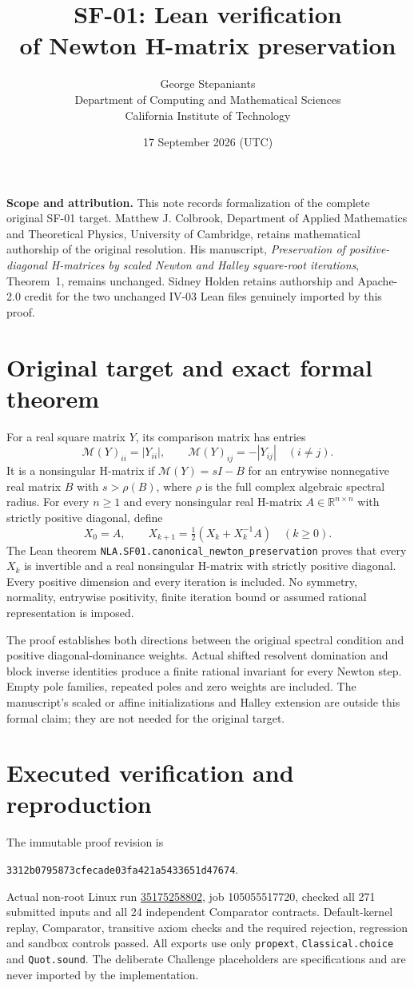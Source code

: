 \documentclass[11pt,a4paper]{article}
\title{\textbf{SF-01: Lean verification\\of Newton H-matrix preservation}}
\author{George Stepaniants\\[3pt]\small Department of Computing and Mathematical Sciences\\\small California Institute of Technology}
\date{17 September 2026 (UTC)}
\begin{document}
\maketitle
\textbf{Scope and attribution.} This note records formalization of the complete
original SF-01 target. Matthew J. Colbrook, Department of Applied Mathematics
and Theoretical Physics, University of Cambridge, retains mathematical
authorship of the original resolution. His manuscript, \emph{Preservation of
positive-diagonal H-matrices by scaled Newton and Halley square-root
iterations}, Theorem~1, remains unchanged. Sidney Holden retains authorship
and Apache-2.0 credit for the two unchanged IV-03 Lean files genuinely
imported by this proof.

\section*{Original target and exact formal theorem}
For a real square matrix $Y$, its comparison matrix has entries
\[
 \mathcal M(Y)_{ii}=|Y_{ii}|,\qquad
 \mathcal M(Y)_{ij}=-|Y_{ij}|\quad(i\ne j).
\]
It is a nonsingular H-matrix if $\mathcal M(Y)=sI-B$ for an entrywise
nonnegative real matrix $B$ with $s>\rho(B)$, where $\rho$ is the full complex
algebraic spectral radius.
For every $n\ge1$ and every nonsingular real H-matrix
$A\in\mathbb R^{n\times n}$ with strictly positive diagonal, define
\[
 X_0=A,\qquad X_{k+1}=\tfrac12(X_k+X_k^{-1}A)\quad(k\ge0).
\]
The Lean theorem \texttt{NLA.SF01.canonical\_newton\_preservation} proves
that every $X_k$ is invertible and a real nonsingular H-matrix with strictly
positive diagonal. Every positive dimension and every iteration is included.
No symmetry, normality, entrywise positivity, finite iteration bound or
assumed rational representation is imposed.

The proof establishes both directions between the original spectral condition
and positive diagonal-dominance weights. Actual shifted resolvent domination
and block inverse identities produce a finite rational invariant for every
Newton step. Empty pole families, repeated poles and zero weights are included.
The manuscript's scaled or affine initializations and Halley extension are
outside this formal claim; they are not needed for the original target.

\section*{Executed verification and reproduction}
The immutable proof revision is
\begin{center}\small\texttt{3312b0795873cfecade03fa421a5433651d47674}.\end{center}
Actual non-root Linux run
\href{https://github.com/sgstepaniants/OpenProblemsInNLA/actions/runs/35175258802/job/105055517720}{35175258802},
job 105055517720, checked all 271 submitted inputs and all 24 independent
Comparator contracts. Default-kernel replay, Comparator, transitive axiom
checks and the required rejection, regression and sandbox controls passed.
All exports use only \texttt{propext}, \texttt{Classical.choice} and
\texttt{Quot.sound}. The deliberate Challenge placeholders are specifications
and are never imported by the implementation.
\end{document}
